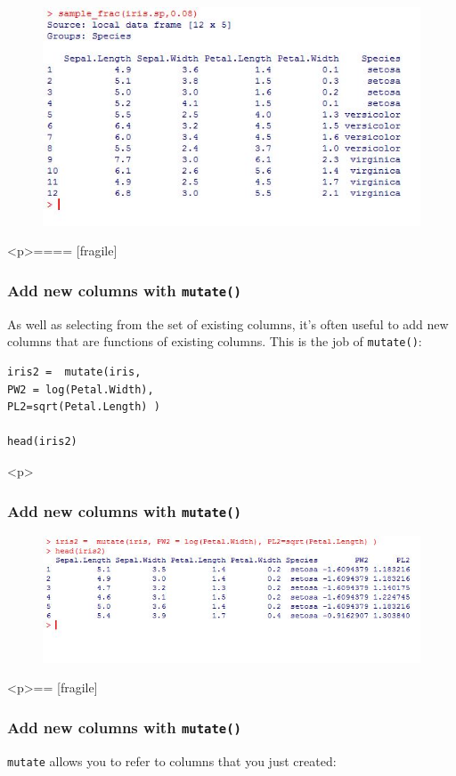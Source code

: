 \begin{figure}
\centering
\includegraphics[width=1.07\linewidth]{images/irissample3}
\end{figure}


<p>====
[fragile]
\frametitle{Add new columns with \texttt{mutate()} }

As well as selecting from the set of existing columns, it’s often useful to add new columns that are functions of existing columns. This is the job of \texttt{mutate()}:


\begin{verbatim}
iris2 =  mutate(iris, 
PW2 = log(Petal.Width), 
PL2=sqrt(Petal.Length) )

head(iris2)
\end{verbatim}


<p> %


\frametitle{Add new columns with \texttt{mutate()} }
\begin{figure}
\centering
\includegraphics[width=1.2\linewidth]{images/irismutate}

\end{figure}


<p>==
[fragile]

\frametitle{Add new columns with \texttt{mutate()} }
\texttt{mutate} allows you to refer to columns that you just created:

